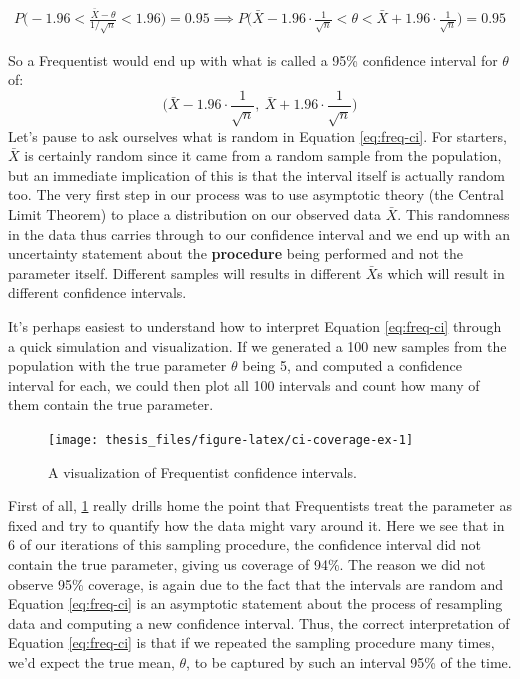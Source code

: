 \documentclass[12pt,twoside]{reedthesis}
\begin{document}
\[
\begin{aligned}
P\bigg(-1.96 < \frac{\bar{X} - \theta}{1/\sqrt{n}} < 1.96\bigg) = 0.95 \implies P\bigg(\bar{X} - 1.96\cdot\frac{1}{\sqrt{n}} < \theta < \bar{X} + 1.96\cdot\frac{1}{\sqrt{n}}\bigg) = 0.95
\end{aligned}
\]

So a Frequentist would end up with what is called a 95\% confidence interval for \(\theta\) of:
\begin{equation}
  \bigg(\bar{X} - 1.96\cdot\frac{1}{\sqrt{n}}, \ \bar{X} + 1.96\cdot\frac{1}{\sqrt{n}}\bigg)
  \label{eq:freq-ci}
\end{equation}
Let's pause to ask ourselves what is random in Equation \eqref{eq:freq-ci}. For starters, \(\bar{X}\) is certainly random since it came from a random sample from the population, but an immediate implication of this is that the interval itself is actually random too. The very first step in our process was to use asymptotic theory (the Central Limit Theorem) to place a distribution on our observed data \(\bar{X}\). This randomness in the data thus carries through to our confidence interval and we end up with an uncertainty statement about the \textbf{procedure} being performed and not the parameter itself. Different samples will results in different \(\bar{X}\)s which will result in different confidence intervals.

It's perhaps easiest to understand how to interpret Equation \eqref{eq:freq-ci} through a quick simulation and visualization. If we generated a 100 new samples from the population with the true parameter \(\theta\) being 5, and computed a confidence interval for each, we could then plot all 100 intervals and count how many of them contain the true parameter.
\begin{figure}

{\centering \texttt{[image: thesis\_files/figure-latex/ci-coverage-ex-1]} 

}

\caption{A visualization of Frequentist confidence intervals.}\label{fig:ci-coverage-ex}
\end{figure}
First of all, \ref{fig:ci-coverage-ex} really drills home the point that Frequentists treat the parameter as fixed and try to quantify how the data might vary around it. Here we see that in 6 of our iterations of this sampling procedure, the confidence interval did not contain the true parameter, giving us coverage of 94\%. The reason we did not observe 95\% coverage, is again due to the fact that the intervals are random and Equation \eqref{eq:freq-ci} is an asymptotic statement about the process of resampling data and computing a new confidence interval. Thus, the correct interpretation of Equation \eqref{eq:freq-ci} is that if we repeated the sampling procedure many times, we'd expect the true mean, \(\theta\), to be captured by such an interval 95\% of the time.
\end{document}
